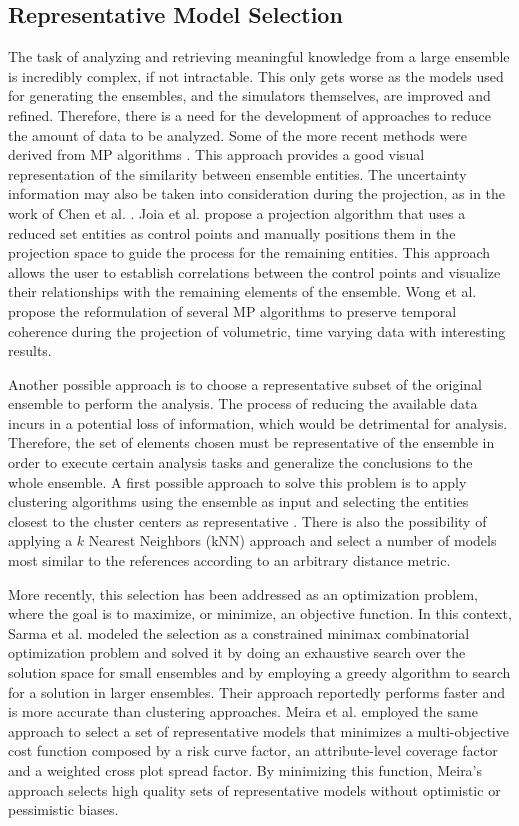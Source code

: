 \documentclass[final,5p,times,twocolumn]{elsarticle}
\begin{document}
\subsection{Representative Model Selection}
The task of analyzing and retrieving meaningful knowledge from a large ensemble is incredibly complex, if not intractable. This only gets worse as the models used for generating the ensembles, and the simulators themselves, are improved and refined. Therefore, there is a need for the development of approaches to reduce the amount of data to be analyzed. Some of the more recent methods were derived from MP algorithms \cite{uncert-proj-chen:2015, mp-wong:2013, lamp-joia:2011}. This approach provides a good visual representation of the similarity between ensemble entities. The uncertainty information may also be taken into consideration during the projection, as in the work of Chen et al. \cite{uncert-proj-chen:2015}. Joia et al. \cite{lamp-joia:2011} propose a projection algorithm that uses a reduced set entities as control points and manually positions them in the projection space to guide the process for the remaining entities. This approach allows the user to establish correlations between the control points and visualize their relationships with the remaining elements of the ensemble. Wong et al. \cite{mp-wong:2013} propose the reformulation of several MP algorithms to preserve temporal coherence during the projection of volumetric, time varying data with interesting results.

Another possible approach is to choose a representative subset of the original ensemble to perform the analysis. The process of reducing the available data incurs in a potential loss of information, which would be detrimental for analysis. Therefore, the set of elements chosen must be representative of the ensemble in order to execute certain analysis tasks and generalize the conclusions to the whole ensemble. A first possible approach to solve this problem is to apply clustering algorithms using the ensemble as input and selecting the entities closest to the cluster centers as representative \cite{lee:2010}. There is also the possibility of applying a $k$ Nearest Neighbors (kNN) approach and select a number of models most similar to the references according to an arbitrary distance metric.

More recently, this selection has been addressed as an optimization problem, where the goal is to maximize, or minimize, an objective function. In this context, Sarma et al. \cite{selection-sarma:2013} modeled the selection as a constrained minimax combinatorial optimization problem and solved it by doing an exhaustive search over the solution space for small ensembles and by employing a greedy algorithm to search for a solution in larger ensembles. Their approach reportedly performs faster and is more accurate than clustering approaches. Meira et al. \cite{meira:2016} employed the same approach to select a set of representative models that minimizes a multi-objective cost function composed by a risk curve factor, an attribute-level coverage factor and a weighted cross plot spread factor. By minimizing this function, Meira's approach selects high quality sets of representative models without optimistic or pessimistic biases.
\end{document}
